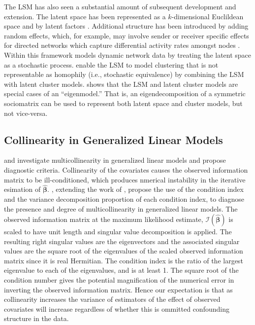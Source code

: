 \documentclass[12pt]{article}
\begin{document}
The LSM has also seen a substantial amount of subsequent development and extension. The latent space has been represented as a $k$-dimensional Euclildean space and by latent factors \citep{hoff2002latent, hoff2009multiplicative}. Additional structure has been introduced by adding random effects, which, for example, may involve sender or receiver specific effects for directed networks which capture differential activity rates amongst nodes \citep{hoff2003random}. Within this framework \cite{westveld2011mixed} models dynamic network data by treating the latent space as a stochastic process. \cite{handcock2007model} enable the LSM to model clustering that is not representable as homophily (i.e., stochastic equivalence) by combining the LSM with latent cluster models. \cite{hoff2008modeling} shows that the LSM and latent cluster models are special cases of an ``eigenmodel.'' That is, an eigendecomposition of a symmetric sociomatrix can be used to represent both latent space and cluster models, 
but not vice-versa.

\subsection{Collinearity in Generalized Linear Models}

\citep{mackinnon1989collinearity} and \citep{weissfeld1991multicollinearity} investigate multicollinearity in generalized linear models and propose diagnostic criteria. Collinearity of the covariates causes the observed information matrix to be ill-conditioned, which produces nmerical instability in the iterative esimation of $\hat{\mathbf{\beta}}$. \citep{weissfeld1991multicollinearity}, extending the work of \citep{davis1986example}, propose the use of the condition index and the variance decomposition proportion of each condition index, to diagnose the presence and degree of multicollinearity in generalized linear models. The observed information matrix at the maximum likelihood estimate, $\mathcal{I}(\hat{\mathbf{\beta}})$ is scaled to have unit length and singular value decomposition is applied. The resulting right singular values are the eigenvectors and the associated singular values are the square root of the eigenvalues of the scaled observed information matrix since it is real Hermitian. The condition index is the ratio of the largest eigenvalue to each of the eigenvalues, and is at least 1. The square root of the condition number gives the potential magnification of the numerical error in inverting the observed information matrix. Hence our expectation is that as collinearity increases the variance of estimators of the effect of observed covariates will increase regardless of whether this is ommitted confounding structure in the data.
\end{document}
